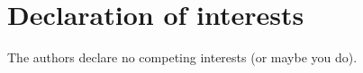 \section*{Declaration of interests}
\label{sec:declaration}
The authors declare no competing interests (or maybe you do).
